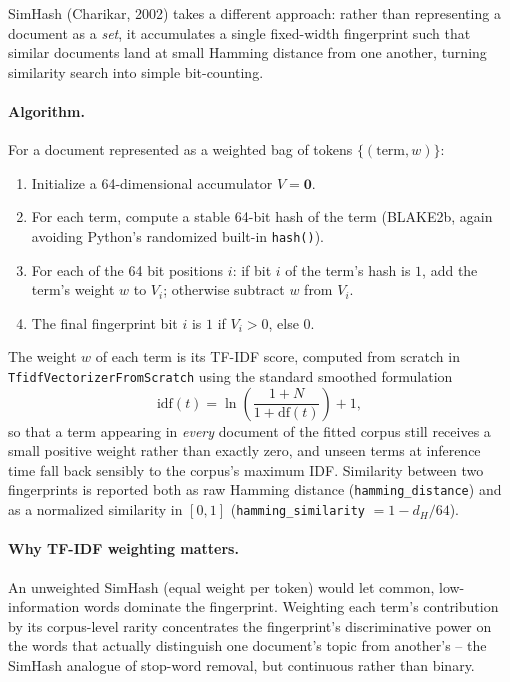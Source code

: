 \documentclass[11pt]{article}
\begin{document}
SimHash (Charikar, 2002) takes a different approach: rather than representing a document as a \emph{set},
it accumulates a single fixed-width fingerprint such that similar documents land at small Hamming
distance from one another, turning similarity search into simple bit-counting.

\paragraph{Algorithm.} For a document represented as a weighted bag of tokens $\{(\text{term}, w)\}$:
\begin{enumerate}[label=\arabic*.]
    \item Initialize a 64-dimensional accumulator $V = \mathbf{0}$.
    \item For each term, compute a stable 64-bit hash of the term (BLAKE2b, again avoiding Python's
          randomized built-in \verb|hash()|).
    \item For each of the 64 bit positions $i$: if bit $i$ of the term's hash is $1$, add the term's
          weight $w$ to $V_i$; otherwise subtract $w$ from $V_i$.
    \item The final fingerprint bit $i$ is $1$ if $V_i > 0$, else $0$.
\end{enumerate}
The weight $w$ of each term is its TF-IDF score, computed from scratch in \verb|TfidfVectorizerFromScratch|
using the standard smoothed formulation
\[
    \text{idf}(t) = \ln\!\left(\frac{1+N}{1+\text{df}(t)}\right) + 1,
\]
so that a term appearing in \emph{every} document of the fitted corpus still receives a small positive
weight rather than exactly zero, and unseen terms at inference time fall back sensibly to the corpus's
maximum IDF. Similarity between two fingerprints is reported both as raw Hamming distance
(\verb|hamming_distance|) and as a normalized similarity in $[0,1]$
(\verb|hamming_similarity| $= 1 - d_H / 64$).

\paragraph{Why TF-IDF weighting matters.} An unweighted SimHash (equal weight per token) would let common,
low-information words dominate the fingerprint. Weighting each term's contribution by its corpus-level rarity
concentrates the fingerprint's discriminative power on the words that actually distinguish one document's
topic from another's -- the SimHash analogue of stop-word removal, but continuous rather than binary.
\end{document}
